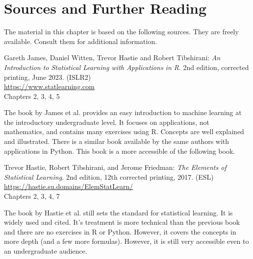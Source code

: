 %
%

\section*{Sources and Further Reading}

The material in this chapter is based on the following sources. They are freely available. Consult them for additional information.

\begin{tcolorbox}[colback=alert]
Gareth James, Daniel Witten, Trevor Hastie and Robert Tibshirani: \emph{An Introduction to Statistical Learning with Applications in R}. 2nd edition, corrected printing, June 2023. (ISLR2) \\
\vspace{1mm}
\url{https://www.statlearning.com} \\
\vspace{1mm}
Chapters 2, 3, 4, 5
\end{tcolorbox}

The book by James et al. provides an easy introduction to machine learning at the introductory undergraduate level. It focuses on applications, not mathematics, and contains many exercises using R. Concepts are well explained and illustrated. There is a similar book available by the same authors with applications in Python. This book is a more accessible of the following book.

\begin{tcolorbox}[colback=alert]
Trevor Hastie, Robert Tibshirani, and Jerome Friedman: \emph{The Elements of Statistical Learning}. 2nd edition, 12th corrected printing, 2017. (ESL) \\
\vspace{1mm}
\url{https://hastie.su.domains/ElemStatLearn/} \\
\vspace{1mm}
Chapters 2, 3, 4, 7
\end{tcolorbox}

The book by Hastie et al. still sets the standard for statistical learning. It is widely used and cited. It's treatment is more technical than the previous book and there are no exercises in R or Python. However, it covers the concepts in more depth (and a few more formulas). However, it is still very accessible even to an undergraduate audience.


